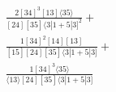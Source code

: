 \documentclass[varwidth, border=5pt]{standalone}
\begin{document}
\begin{my}
$\begin{gathered}
\scriptscriptstyle\frac{2[34]^3[13]⟨35⟩}{[24][35]⟨3|1+5|3]^2}+\\
\scriptscriptstyle\frac{1[34]^2[14][13]}{[15][24][35]⟨3|1+5|3]}+\\
\scriptscriptstyle\frac{1[34]^3⟨35⟩}{⟨13⟩[24][35]⟨3|1+5|3]}\phantom{+}
\end{gathered}$
\end{my}
\end{document}
